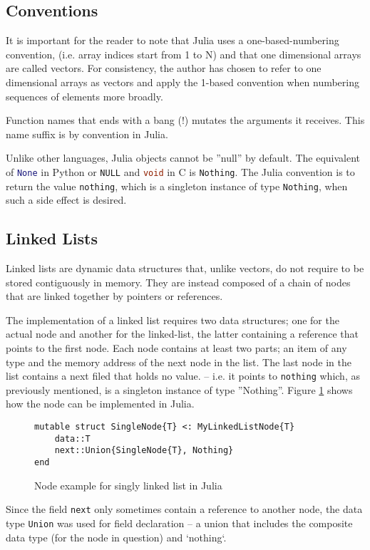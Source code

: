 \documentclass[a4paper, 11pt]{article}
\begin{document}
    \subsection*{Conventions}
    It is important for the reader to note that Julia uses a one-based-numbering
    convention, (i.e. array indices start from 1 to N) and that one dimensional
    arrays are called vectors. 
    For consistency, the author has chosen to refer to one dimensional
    arrays as vectors and apply the 1-based convention when numbering
    sequences of elements more broadly. 

    Function names that ends with a bang (!) mutates the arguments it receives. 
    This name suffix is by convention in Julia. 
    
    Unlike other languages, Julia objects cannot be ''null'' by default. The
    equivalent of \lstinline[language=Python]{None} in Python 
    or \lstinline[language=C]{NULL} and \lstinline[language=C]{void} in C is
    \texttt{Nothing}. The Julia convention is to return the value \texttt{nothing}, which is a
    singleton instance of type \texttt{Nothing}, when such a side effect is
    desired. 
    \subsection*{Linked Lists}
    Linked lists are dynamic data structures that, unlike vectors, do not require
    to be stored contiguously in memory. They are instead composed of a chain of 
    nodes that are linked together by pointers or references. 
    
    The implementation of a linked list requires two data structures;
    one for the actual node and another for the linked-list, the latter containing a
    reference that points to the first node.
    Each node contains at least two parts; an item of any type and 
    the memory address of the next node in the list. 
    The last node in the list contains a next filed that holds no value.  
    -- i.e. it points to \texttt{nothing} which, as previously mentioned, is a 
    singleton instance of type ''Nothing''. 
    Figure \ref{code:node} shows how the node can be implemented in Julia. 

    \begin{figure}[H]
        \centering
    \begin{verbatim}
mutable struct SingleNode{T} <: MyLinkedListNode{T}
    data::T
    next::Union{SingleNode{T}, Nothing}
end

    \end{verbatim}
    \caption{Node example for singly linked list in Julia}
    \label{code:node}
    \end{figure}
    Since the field \texttt{next} only sometimes contain a
    reference to another node, the data type \texttt{Union} was used for field
    declaration -- a union that includes the composite
    data type (for the node in question) and `nothing`.
    
\end{document}
